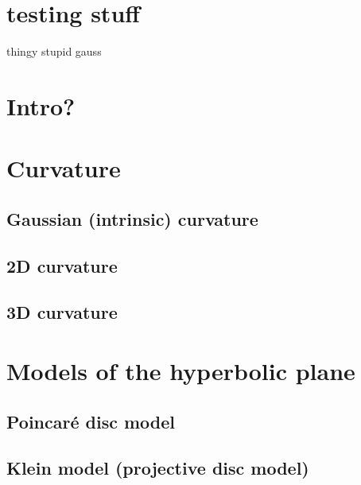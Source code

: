 \documentclass{article}
\title{\todo{FANCY TITLE}}
\author{BarbaraJoy Jones}
\date{\todo{16 October 2009}}
\begin{document}
\maketitle

\section{testing stuff}
thingy \cite{R3surfaces}
stupid gauss \cite{gauss}


\section{Intro?}

\section{Curvature}
\subsection{Gaussian (intrinsic) curvature}
\subsection{2D curvature}
\subsection{3D curvature}

\section{Models of the hyperbolic plane}
\subsection{Poincar\'e disc model}
\subsection{Klein model (projective disc model)}
\end{document}
